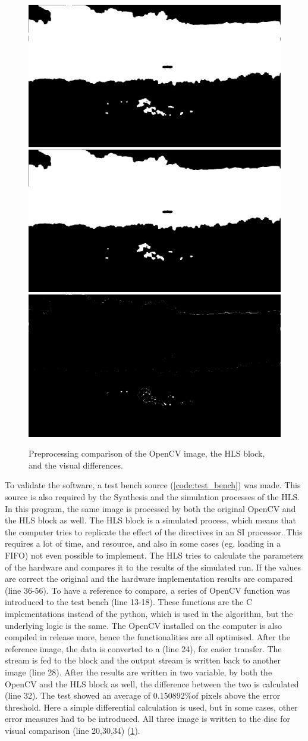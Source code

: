 \begin{figure}
    \centering
    \includegraphics[width=.32\linewidth]{images/preproc/out_ocv.jpg}
    \includegraphics[width=.32\linewidth]{images/preproc/hls_out.jpg}
    \includegraphics[width=.32\linewidth]{images/preproc/error.png}
    \caption{Preprocessing comparison of the OpenCV image, the HLS block, and the visual differences.}
    \label{fig:preproc_compare}
\end{figure}

To validate the software, a test bench source (\cref{code:test_bench}) was made.
This source is also required by the Synthesis and the simulation processes of the HLS.
In this program, the same image is processed by both the original OpenCV and the HLS block as well.
The HLS block is a simulated process, which means that the computer tries to replicate the effect of the directives in an SI processor.
This requires a lot of time, and resource, and also in some cases (eg. loading in a FIFO) not even possible to implement.
The HLS tries to calculate the parameters of the hardware and compares it to the results of the simulated run.
If the values are correct the original and the hardware implementation results are compared (line 36-56).
To have a reference to compare, a series of OpenCV function was introduced to the test bench (line 13-18).
These functions are the C implementations instead of the python, which is used in the algorithm, but the underlying logic is the same.
The OpenCV installed on the computer is also compiled in release more, hence the functionalities are all optimised.
After the reference image, the data is converted to a  (line 24), for easier transfer.
The stream is fed to the block and the output stream is written back to another image (line 28).
After the results are written in two variable, by both the OpenCV and the HLS block as well, the difference between the two is calculated (line 32).
The test showed an average of 0.150892\%of pixels above the error threshold.
Here a simple differential calculation is used, but in some cases, other error measures had to be introduced.
All three image is written to the disc for visual comparison (line 20,30,34) (\cref{fig:preproc_compare}).

